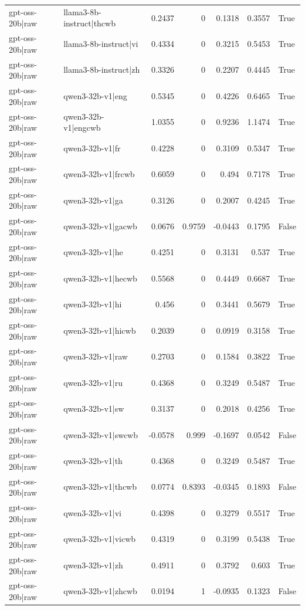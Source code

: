 \begin{table}
\begin{tabular}{l l r r r r l}
gpt-oss-20b|raw & llama3-8b-instruct|thcwb & 0.2437 & 0 & 0.1318 & 0.3557 & True \\
gpt-oss-20b|raw & llama3-8b-instruct|vi & 0.4334 & 0 & 0.3215 & 0.5453 & True \\
gpt-oss-20b|raw & llama3-8b-instruct|zh & 0.3326 & 0 & 0.2207 & 0.4445 & True \\
gpt-oss-20b|raw & qwen3-32b-v1|eng & 0.5345 & 0 & 0.4226 & 0.6465 & True \\
gpt-oss-20b|raw & qwen3-32b-v1|engcwb & 1.0355 & 0 & 0.9236 & 1.1474 & True \\
gpt-oss-20b|raw & qwen3-32b-v1|fr & 0.4228 & 0 & 0.3109 & 0.5347 & True \\
gpt-oss-20b|raw & qwen3-32b-v1|frcwb & 0.6059 & 0 & 0.494 & 0.7178 & True \\
gpt-oss-20b|raw & qwen3-32b-v1|ga & 0.3126 & 0 & 0.2007 & 0.4245 & True \\
gpt-oss-20b|raw & qwen3-32b-v1|gacwb & 0.0676 & 0.9759 & -0.0443 & 0.1795 & False \\
gpt-oss-20b|raw & qwen3-32b-v1|he & 0.4251 & 0 & 0.3131 & 0.537 & True \\
gpt-oss-20b|raw & qwen3-32b-v1|hecwb & 0.5568 & 0 & 0.4449 & 0.6687 & True \\
gpt-oss-20b|raw & qwen3-32b-v1|hi & 0.456 & 0 & 0.3441 & 0.5679 & True \\
gpt-oss-20b|raw & qwen3-32b-v1|hicwb & 0.2039 & 0 & 0.0919 & 0.3158 & True \\
gpt-oss-20b|raw & qwen3-32b-v1|raw & 0.2703 & 0 & 0.1584 & 0.3822 & True \\
gpt-oss-20b|raw & qwen3-32b-v1|ru & 0.4368 & 0 & 0.3249 & 0.5487 & True \\
gpt-oss-20b|raw & qwen3-32b-v1|sw & 0.3137 & 0 & 0.2018 & 0.4256 & True \\
gpt-oss-20b|raw & qwen3-32b-v1|swcwb & -0.0578 & 0.999 & -0.1697 & 0.0542 & False \\
gpt-oss-20b|raw & qwen3-32b-v1|th & 0.4368 & 0 & 0.3249 & 0.5487 & True \\
gpt-oss-20b|raw & qwen3-32b-v1|thcwb & 0.0774 & 0.8393 & -0.0345 & 0.1893 & False \\
gpt-oss-20b|raw & qwen3-32b-v1|vi & 0.4398 & 0 & 0.3279 & 0.5517 & True \\
gpt-oss-20b|raw & qwen3-32b-v1|vicwb & 0.4319 & 0 & 0.3199 & 0.5438 & True \\
gpt-oss-20b|raw & qwen3-32b-v1|zh & 0.4911 & 0 & 0.3792 & 0.603 & True \\
gpt-oss-20b|raw & qwen3-32b-v1|zhcwb & 0.0194 & 1 & -0.0935 & 0.1323 & False \\

\end{tabular}
\end{table}
